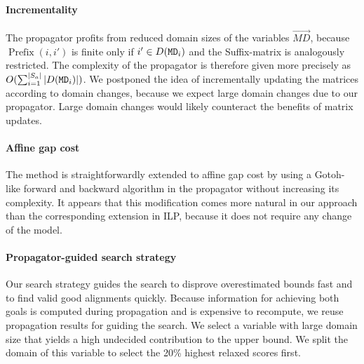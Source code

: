 \documentclass{easychair}
\begin{document}
\paragraph{Incrementality}
The propagator profits from reduced domain sizes of the variables
$\vec{MD}$, because $\operatorname{Prefix}{(i,i')}$ is finite only if
$i'\in D(\texttt{MD}_i)$ and the Suffix-matrix is analogously
restricted. The complexity of the propagator is therefore given more
precisely as $O(\sum_{i=1}^{|S_a|}|D(\texttt{MD}_i)|)$. We postponed the
idea of incrementally updating the matrices according to domain
changes, because we expect large domain changes due to our
propagator. Large domain changes would likely counteract the benefits
of matrix updates.

\paragraph{Affine gap cost}
The method is straightforwardly extended to affine gap cost by using a
Gotoh-like forward and backward algorithm in the propagator without
increasing its complexity. It appears that this modification comes
more natural in our approach than the corresponding extension in ILP,
because it does not require any change of the model.

\paragraph{Propagator-guided search strategy}
Our search strategy guides the search to disprove overestimated bounds
fast and to find valid good alignments quickly. Because information
for achieving both goals is computed during propagation and is
expensive to recompute, we reuse propagation results for guiding the
search. We select a variable with large domain size that yields a high
undecided contribution to the upper bound. We split the domain of this
variable to select the 20\% highest relaxed scores first.


\end{document}
